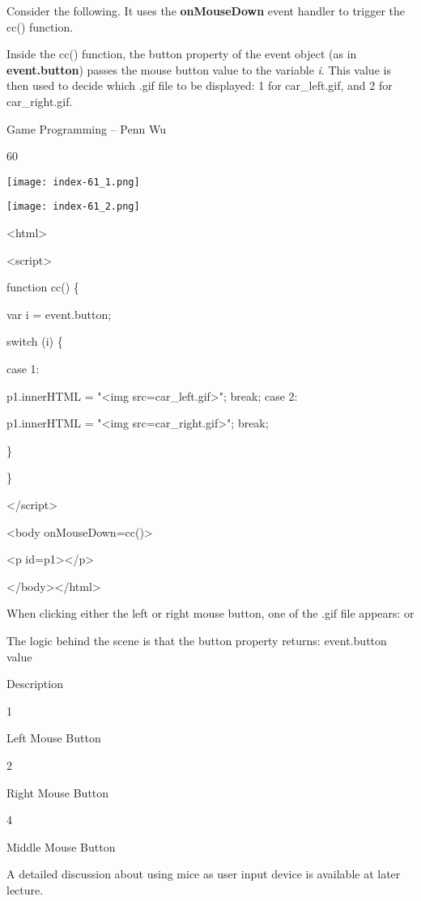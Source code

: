 \documentclass[
]{article}
\begin{document}
Consider the following. It uses the \textbf{onMouseDown} event handler
to trigger the cc() function.

Inside the cc() function, the button property of the event object (as in
\textbf{event.button}) passes the mouse button value to the variable
\emph{i}. This value is then used to decide which .gif file to be
displayed: 1 for car\_left.gif, and 2 for car\_right.gif.

Game Programming -- Penn Wu

60

\protect\hypertarget{index_split_005.htmlux5cux23p61}{}{}\texttt{[image: index-61\_1.png]}

\texttt{[image: index-61\_2.png]}

\textless html\textgreater{}

\textless script\textgreater{}

function cc() \{

var i = event.button;

switch (i) \{

case 1:

p1.innerHTML = "\textless img
src=\textquotesingle car\_left.gif\textquotesingle\textgreater"; break;
case 2:

p1.innerHTML = "\textless img
src=\textquotesingle car\_right.gif\textquotesingle\textgreater"; break;

\}

\}

\textless/script\textgreater{}

\textless body onMouseDown=cc()\textgreater{}

\textless p id=p1\textgreater\textless/p\textgreater{}

\textless/body\textgreater\textless/html\textgreater{}

When clicking either the left or right mouse button, one of the .gif
file appears: or

The logic behind the scene is that the button property returns:
event.button value

Description

1

Left Mouse Button

2

Right Mouse Button

4

Middle Mouse Button

A detailed discussion about using mice as user input device is available
at later lecture.
\end{document}

